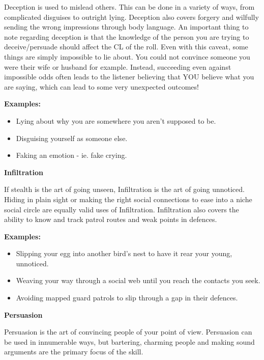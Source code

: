 Deception is used to mislead others. This can be done in a variety of ways, from complicated disguises to outright lying. Deception also covers forgery and wilfully sending the wrong impressions through body language. An important thing to note regarding deception is that the knowledge of the person you are trying to deceive/persuade should affect the CL of the roll. Even with this caveat, some things are simply impossible to lie about. You could not convince someone you were their wife or husband for example. Instead, succeeding even against impossible odds often leads to the listener believing that YOU believe what you are saying, which can lead to some very unexpected outcomes!

\begin{displayquote}
    \textbf{Examples:}
    \begin{itemize}
        \item Lying about why you are somewhere you aren't supposed to be.
        \item Disguising yourself as someone else.
        \item Faking an emotion - ie. fake crying.
    \end{itemize}
\end{displayquote}

\textbf{Infiltration}

If stealth is the art of going unseen, Infiltration is the art of going unnoticed. Hiding in plain sight or making the right social connections to ease into a niche social circle are equally valid uses of Infiltration. Infiltration also covers the ability to know and track patrol routes and weak points in defences.

\begin{displayquote}
    \textbf{Examples:}
    \begin{itemize}
        \item Slipping your egg into another bird's nest to have it rear your young, unnoticed.
        \item Weaving your way through a social web until you reach the contacts you seek.
        \item Avoiding mapped guard patrols to slip through a gap in their defences.
    \end{itemize}
\end{displayquote}

\textbf{Persuasion}

Persuasion is the art of convincing people of your point of view. Persuasion can be used in innumerable ways, but bartering, charming people and making sound arguments are the primary focus of the skill.

